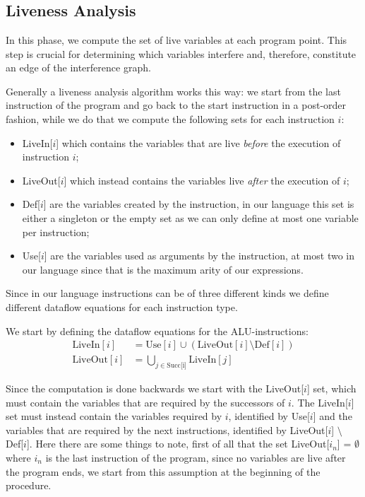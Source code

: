 
\chapter{}
\label{cha:ra}

\section{Liveness Analysis}
\label{sec:liveness}

In this phase, we compute the set of live variables at each program point. This step is crucial for determining which variables interfere and, therefore, constitute an edge of the interference graph.

Generally a liveness analysis algorithm works this way:
we start from the last instruction of the program and go back to the start instruction in a post-order fashion, while we do that we compute the following sets for each instruction $i$:
\begin{itemize}
  \item LiveIn[$i$] which contains the variables that are live \textit{before} the execution of instruction $i$;
  \item LiveOut[$i$] which instead contains the variables live \textit{after} the execution of $i$;
  \item Def[$i$] are the variables created by the instruction, in our language this set is either a singleton or the empty set as we can only define at most one variable per instruction;
  \item Use[$i$] are the variables used as arguments by the instruction, at most two in our language since that is the maximum arity of our expressions.
\end{itemize}

Since in our language instructions can be of three different kinds we define different dataflow equations for each instruction type.

We start by defining the dataflow equations for the ALU-instructions:
\begin{align*}
  \text{LiveIn}[i] &= \text{Use}[i] \cup (\text{LiveOut}[i] \setminus \text{Def}[i]) \\
  \text{LiveOut}[i] &= \bigcup \limits_{j \in \text{Succ[i]}} \text{LiveIn}[j]
\end{align*}

Since the computation is done backwards we start with the LiveOut[$i$] set, which must contain the variables that are required by the successors of $i$. The
LiveIn[$i$] set must instead contain the variables required by $i$, identified by Use[$i$] and the variables that are required by the next instructions, identified by LiveOut[$i$] $\setminus$ Def[$i$].
Here there are some things to note, first of all that the set LiveOut[$i_n$] = $\emptyset$ where $i_n$ is the last instruction of the program, since no variables are live after the program ends, we start from this assumption at the beginning of the procedure.

